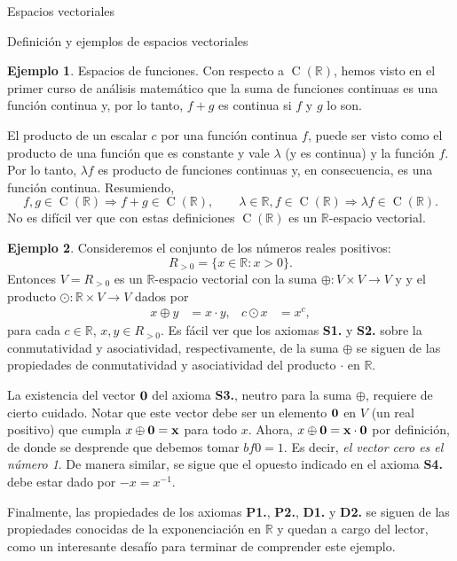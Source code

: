 \documentclass[a4paper,12pt,twoside,spanish]{amsbook}
\theoremstyle{definition}
\newtheorem{ejemplo}{Ejemplo}[section]
\theoremstyle{remark}
\newcommand{\R}{\mathbb R}
\begin{document}
\begin{chapter}{Espacios vectoriales}
\begin{section}{Definición y ejemplos de espacios vectoriales}
\begin{ejemplo}{\sc Espacios de funciones.}
				Con respecto a $\operatorname{C}(\R)$, hemos visto en el primer curso de análisis matemático  que la suma de funciones continuas es una función continua y, por lo tanto, $f+g$ es continua si $f$ y $g$ lo son.  
				
				El producto de un escalar $c$ por una función continua $f$,  puede ser visto como el producto de una función que es constante y vale $\lambda $ (y es continua) y la función $f$. Por lo tanto, $\lambda f$ es producto de funciones continuas y, en consecuencia, es una función continua.  Resumiendo,
				\begin{equation*}
				f, g \in \operatorname{C}(\R) \Rightarrow f+g \in \operatorname{C}(\R), \qquad \lambda \in \R, f \in \operatorname{C}(\R) \Rightarrow \lambda f \in \operatorname{C}(\R).
				\end{equation*}
				No es difícil ver que con estas definiciones $\operatorname{C}(\R)$  es un $\R$-espacio vectorial.
			\end{ejemplo}
			
            
			
			\medspace
			
			\begin{ejemplo}
            Consideremos el conjunto de los números reales positivos:
            \[
            R_{>0}=\{x\in\R : x>0\}.
            \]
            Entonces $V=R_{>0}$ es un $\R$-espacio vectorial con la suma $\oplus:V\times V\to V$ y  y el producto $\odot:\R\times V\to V$ dados por
            \begin{align*}
            x\oplus y&=x\cdot y, & c\odot x&=x^c,
            \end{align*}
            para cada $c\in\R$, $x,y\in R_{>0}$.
Es fácil ver que los axiomas \textbf{S1.} y \textbf{S2.} sobre la conmutatividad y asociatividad, respectivamente, de la suma $\oplus$ se siguen de las propiedades de conmutatividad y asociatividad del producto $\cdot$ en $\R$.

La existencia del vector $\bf0$ del axioma \textbf{S3.}, neutro para la suma $\oplus$, requiere de cierto cuidado. Notar que este vector debe ser un elemento $\bf0$ en $V$ (un real positivo) que cumpla $x\oplus \bf 0=x$ para todo $x$. Ahora, $x\oplus \bf0=x\cdot \bf0$ por definición, de donde se desprende que debemos tomar $bf0=1$. Es decir, {\it el vector cero es el número 1}. De manera similar, se sigue que el opuesto indicado en el  axioma \textbf{S4.} debe estar dado por $-x=x^{-1}$.

Finalmente, las propiedades de los axiomas \textbf{P1.}, \textbf{P2.}, \textbf{D1.} y \textbf{D2.} se siguen de las propiedades conocidas de la exponenciación en $\R$ y quedan a cargo del lector, como un interesante desafío para terminar de comprender este ejemplo.
\end{ejemplo}            
            

\end{section}
\end{chapter}
\end{document}
